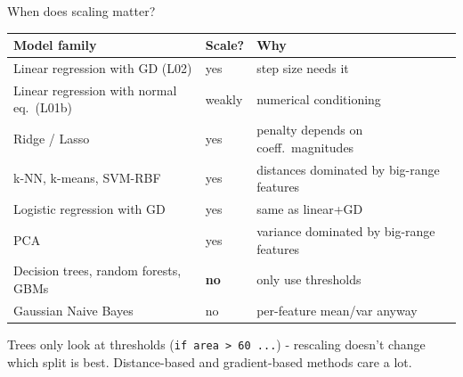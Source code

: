 \documentclass[aspectratio=169]{beamer}
\begin{document}
\begin{frame}{When does scaling matter?}
  \begin{center}\small
    \begin{tabular}{p{6.5cm} l p{5cm}}
      \textbf{Model family} & \textbf{Scale?} & \textbf{Why} \\
      \hline
      Linear regression with GD (L02) & yes & step size needs it \\
      Linear regression with normal eq.\ (L01b) & weakly & numerical conditioning \\
      Ridge / Lasso & yes & penalty depends on coeff.\ magnitudes \\
      k-NN, k-means, SVM-RBF & yes & distances dominated by big-range features \\
      Logistic regression with GD & yes & same as linear+GD \\
      PCA & yes & variance dominated by big-range features \\
      Decision trees, random forests, GBMs & \textbf{no} & only use thresholds \\
      Gaussian Naive Bayes & no & per-feature mean/var anyway \\
    \end{tabular}
  \end{center}
  \vfill
  Trees only look at thresholds (\texttt{if area > 60 ...}) - rescaling doesn't change which split is best. Distance-based and gradient-based methods care a lot.
\end{frame}
\end{document}
